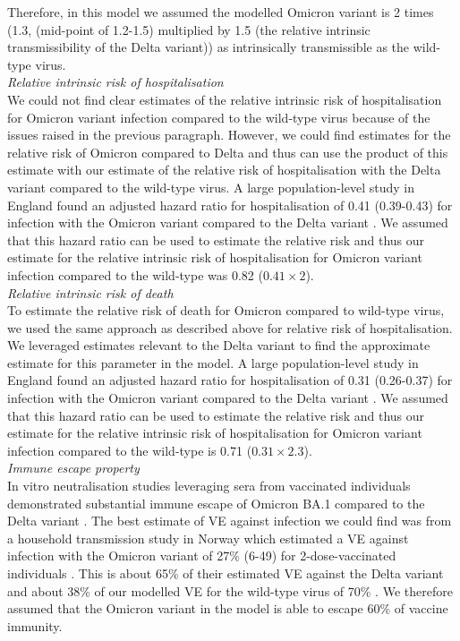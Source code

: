 Therefore, in this model we assumed the modelled Omicron variant is 2 times 
(1.3, (mid-point of 1.2-1.5) multiplied by 1.5 (the relative intrinsic transmissibility of the Delta variant)) as intrinsically transmissible as the wild-type virus.\\

\textit{Relative intrinsic risk of hospitalisation}\\
We could not find clear estimates of the relative intrinsic risk of hospitalisation for Omicron variant infection compared to the wild-type virus because of the issues raised in the previous paragraph. However, we could find estimates 
for the relative risk of Omicron compared to Delta and thus can use the product of this estimate with our estimate of the relative risk of hospitalisation 
with the Delta variant compared to the wild-type virus. A large population-level study in England found an adjusted hazard ratio for hospitalisation of 0.41 (0.39-0.43) for infection 
with the Omicron variant compared to the Delta variant \cite{nyberg2022}. We assumed that this hazard ratio can be used to estimate the relative risk and thus our 
estimate for the relative intrinsic risk of hospitalisation for Omicron variant infection compared to the wild-type was 0.82 ($0.41\times2$).\\

\textit{Relative intrinsic risk of death}\\
To estimate the relative risk of death for Omicron compared to wild-type virus, we used the same approach as described above for relative risk of hospitalisation.
We leveraged estimates relevant to the Delta variant to find the approximate estimate for this parameter in the model.
A large population-level study in England found an adjusted hazard ratio for hospitalisation of 0.31 (0.26-0.37) for infection with the Omicron variant compared to the Delta variant \cite{nyberg2022}. 
We assumed that this hazard ratio can be used to estimate the relative risk and thus our estimate for the relative intrinsic risk of hospitalisation for Omicron variant infection compared to the wild-type is 0.71 ($0.31 \times 2.3$).\\

\textit{Immune escape property}\\
In vitro neutralisation studies leveraging sera from vaccinated individuals demonstrated substantial immune escape of Omicron BA.1 compared to the Delta variant \cite{willett2022}. 
The best estimate of VE against infection we could find was from a household transmission study in Norway which estimated a VE against infection with the Omicron variant of 27\% (6-49) for 2-dose-vaccinated 
individuals \cite{jalili2022}. This is about 65\% of their estimated VE against the Delta variant and about 38\% of our modelled VE for the wild-type virus of 70\% \cite{jalili2022}. We therefore assumed that 
the Omicron variant in the model is able to escape 60\% of vaccine immunity.
